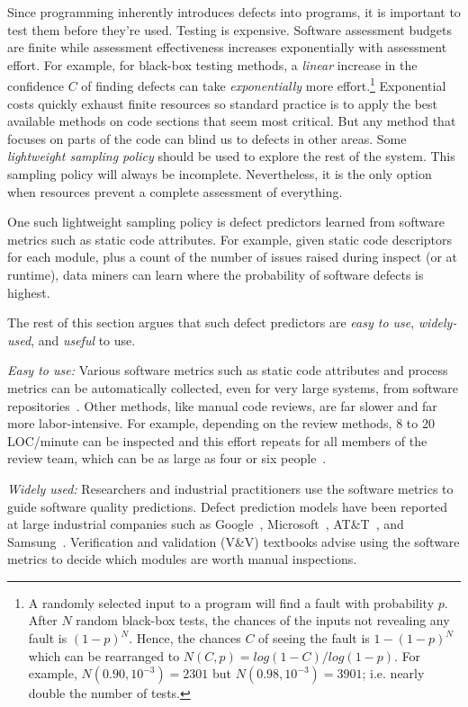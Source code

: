 Since programming inherently
introduces defects into  programs, it is important to test them before they're used.
Testing is expensive.
Software assessment budgets are finite
while assessment effectiveness increases 
exponentially with assessment effort.
For example, for  black-box testing methods,
a {\em linear} increase
in the confidence $C$ of finding  defects
can take {\em exponentially} more effort.\footnote{A randomly selected 
input to a program will find a fault with probability $p$.
After $N$ random black-box tests, the chances of the inputs 
not revealing any fault 
is $(1-p)^N$. Hence, the chances $C$ of seeing the fault is $1-(1-p)^N$
which can be rearranged to 
 $N(C,p)=log(1 -
C)/log(1-p)$. For example, $N(0.90,10^{-3})=2301$
but $N(0.98,10^{-3})=3901$; i.e. nearly double the number of tests.}
Exponential costs quickly exhaust finite resources so
standard practice is to apply the best
available  methods on code sections that seem most critical. 
But any method that focuses on parts of the code
can blind us to defects in other areas. Some  {\em lightweight sampling policy} should be used to explore the rest of the system.
This sampling policy will always be incomplete.
Nevertheless, it is the only option when
resources prevent a complete assessment of everything.

One such lightweight sampling policy is defect predictors learned from software metrics such as static code attributes.
For example, given static code descriptors for each module, plus a count of the number of issues raised during inspect (or at runtime),
data miners can learn where the probability of software defects is highest.


The rest of this section argues that such defect predictors are   {\em easy to
use}, {\em widely-used}, and {\em useful} to use.

{\em Easy to use:} Various software metrics such as static code attributes and process metrics can be automatically collected, even for very large systems, from software repositories~\cite{Basili96,Halstead77,McCabe76,nagappan05,Rahman13}.
Other methods, like  manual code reviews, are far slower and far more labor-intensive.
For example, depending on the review methods, 8 to 20 LOC/minute can be
inspected and this effort repeats for all members of the review team,
which can be as large as four or six people~\cite{me02f}. 

{\em Widely used:}  Researchers and industrial practitioners  use the software metrics to guide software 
quality predictions.
 Defect prediction models have been reported
  at large industrial companies such as Google~\cite{lewis13}, Microsoft~\cite{Nagappan06}, AT\&T~\cite{Ostrand05}, and Samsung~\cite{Kim15remi}.
Verification and validation (V\&V) textbooks
\cite{rakitin01} advise using the software metrics
to decide which modules are worth manual inspections. 


